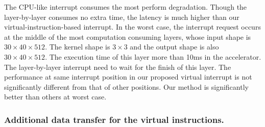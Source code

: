 
The CPU-like interrupt consumes the most perform degradation. Though the layer-by-layer consumes no extra time, the latency is much higher than our virtual-instruction-based interrupt. In the worst case, the interrupt request occurs at the middle of the most computation consuming layers, whose input shape is $30 \times 40 \times 512$. The kernel shape is $3 \times 3$ and the output shape is also $30 \times 40 \times 512$. The execution time of this layer more than 10ms in the accelerator.
The layer-by-layer interrupt need to wait for the finish of this layer. The performance at same interrupt position in our proposed virtual interrupt is not significantly different from that of other positions. Our method is significantly better than others at worst case. 


\subsubsection{ Additional data transfer for the virtual instructions. }

